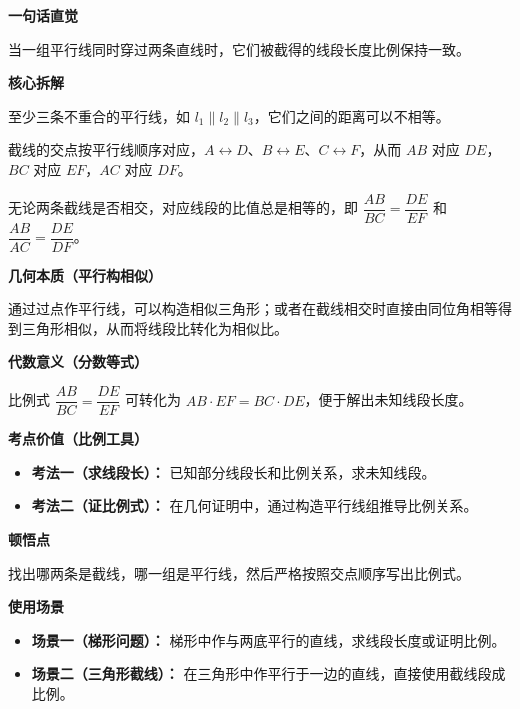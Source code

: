 \begin{explanationbox}
	\textbf{\textcolor{CExplanation}{一句话直觉}}

	当一组平行线同时穿过两条直线时，它们被截得的线段长度比例保持一致。

	\medskip
	\textbf{\textcolor{CExplanation}{核心拆解}}
	\begin{description}[style=nextline, leftmargin=2.8em, labelsep=0.5em, itemsep=0.45em]
		\item[\textbf{要点一（三线平行组）：}] 至少三条不重合的平行线，如 $l_1\parallel l_2\parallel l_3$，它们之间的距离可以不相等。
		\item[\textbf{要点二（对应次序）：}] 截线的交点按平行线顺序对应，$A\leftrightarrow D$、$B\leftrightarrow E$、$C\leftrightarrow F$，从而 $AB$ 对应 $DE$，$BC$ 对应 $EF$，$AC$ 对应 $DF$。
		\item[\textbf{要点三（比例恒等）：}] 无论两条截线是否相交，对应线段的比值总是相等的，即 $\dfrac{AB}{BC}=\dfrac{DE}{EF}$ 和 $\dfrac{AB}{AC}=\dfrac{DE}{DF}$。
	\end{description}

	\medskip
	\textbf{\textcolor{CExplanation}{几何本质（平行构相似）}}

	通过过点作平行线，可以构造相似三角形；或者在截线相交时直接由同位角相等得到三角形相似，从而将线段比转化为相似比。

	\medskip
	\textbf{\textcolor{CExplanation}{代数意义（分数等式）}}

	比例式 $\dfrac{AB}{BC}=\dfrac{DE}{EF}$ 可转化为 $AB\cdot EF = BC\cdot DE$，便于解出未知线段长度。

	\medskip
	\textbf{\textcolor{CExplanation}{考点价值（比例工具）}}
	\begin{itemize}[leftmargin=*, itemsep=0.5em, topsep=0.4em]
		\item \textbf{考法一（求线段长）：} 已知部分线段长和比例关系，求未知线段。
		\item \textbf{考法二（证比例式）：} 在几何证明中，通过构造平行线组推导比例关系。
	\end{itemize}

	\medskip
	\textbf{\textcolor{CExplanation}{顿悟点}}

	找出哪两条是截线，哪一组是平行线，然后严格按照交点顺序写出比例式。

	\medskip
	\textbf{\textcolor{CExplanation}{使用场景}}
	\begin{itemize}[leftmargin=*, itemsep=0.5em, topsep=0.4em]
		\item \textbf{场景一（梯形问题）：} 梯形中作与两底平行的直线，求线段长度或证明比例。
		\item \textbf{场景二（三角形截线）：} 在三角形中作平行于一边的直线，直接使用截线段成比例。
	\end{itemize}
\end{explanationbox}
